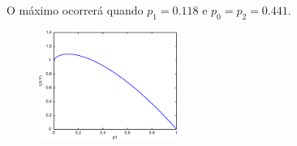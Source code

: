 \begin{frame}[allowframebreaks]
\begin{exercise}
  \exercisebreak

  

  O máximo ocorrerá quando $p_1 = 0.118$ e $p_0 = p_2 = 0.441$.

  \exercisebreak

  \begin{figure}[h!]
  \centering
  \includegraphics[width=0.4\textwidth]{images/exmpl-max-i.pdf}
  \label{fig:exmpl-max-i}
  \end{figure}

  \end{exercise}
  
\end{frame}

